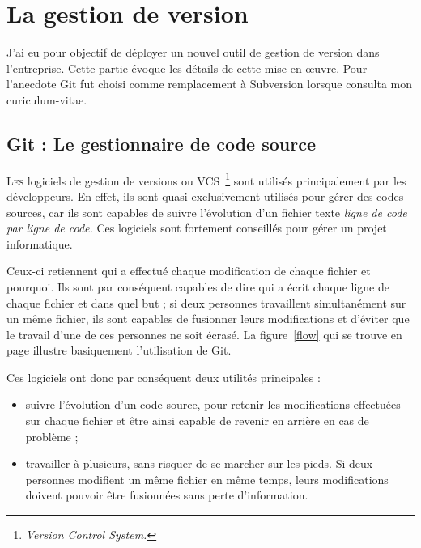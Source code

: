 \chapter{La gestion de version} %
\label{cha:La gestion de version}

\begin{it}

J'ai eu pour objectif de déployer un nouvel outil de gestion de version
dans l'entreprise. Cette partie évoque les détails de cette mise en
\oe{}uvre. Pour l'anecdote Git fut choisi comme remplacement à
Subversion lorsque \mbox{} consulta mon curiculum-vitae.

\end{it}

\section{Git : Le gestionnaire de code source} %
\label{sec:Git : Le gestionnaire de code source}

\lettrine{L}{es} logiciels de gestion de versions ou VCS\,
\footnote{\emph{Version Control System.}} sont utilisés principalement
par les développeurs. En effet, ils sont quasi exclusivement utilisés
pour gérer des codes sources, car ils sont capables de suivre
l’évolution d’un fichier texte \emph{ligne de code par ligne de code.}
Ces logiciels sont fortement conseillés pour gérer un projet
informatique.

Ceux-ci retiennent qui a effectué chaque modification de chaque fichier
et pourquoi. Ils sont par conséquent capables de dire qui a écrit chaque
ligne de chaque fichier et dans quel but ; si deux personnes travaillent
simultanément sur un même fichier, ils sont capables de fusionner leurs
modifications et d’éviter que le travail d’une de ces personnes ne soit
écrasé. La figure~\ref{flow} qui se trouve en page \pageref{flow}
illustre basiquement l'utilisation de Git.

Ces logiciels ont donc par conséquent deux utilités principales :
\begin{itemize}

  \item suivre l’évolution d’un code source, pour retenir les
    modifications effectuées sur chaque fichier et être ainsi capable de
    revenir en arrière en cas de problème ;

  \item travailler à plusieurs, sans risquer de se marcher sur les
    pieds.  Si deux personnes modifient un même fichier en même temps,
    leurs modifications doivent pouvoir être fusionnées sans perte
    d’information.

\end{itemize}

